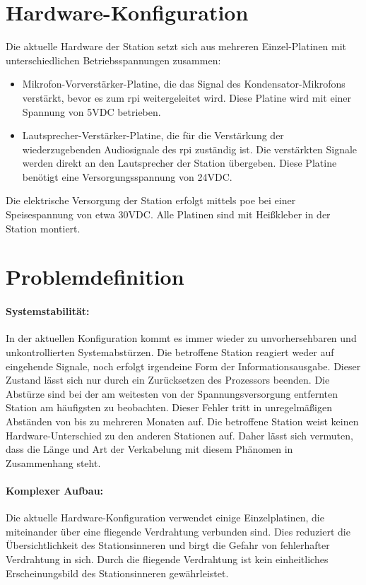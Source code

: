 \section{Hardware-Konfiguration}
Die aktuelle Hardware der Station setzt sich aus mehreren Einzel-Platinen mit unterschiedlichen Betriebsspannungen zusammen:
\begin{itemize}
    \item Mikrofon-Vorverstärker-Platine, die das Signal des Kondensator-Mikrofons verstärkt, bevor es zum \ac{rpi} weitergeleitet wird. Diese Platine wird mit einer Spannung von 5VDC betrieben.
    \item Lautsprecher-Verstärker-Platine, die für die Verstärkung der wiederzugebenden Audiosignale des \ac{rpi} zuständig ist. Die verstärkten Signale werden direkt an den Lautsprecher der Station übergeben. Diese Platine benötigt eine Versorgungsspannung von 24VDC.
\end{itemize}
Die elektrische Versorgung der Station erfolgt mittels \ac{poe} bei einer Speisespannung von etwa 30VDC.
Alle Platinen sind mit Heißkleber in der Station montiert.

\section{Problemdefinition}
\paragraph{Systemstabilität:} %
In der aktuellen Konfiguration kommt es immer wieder zu unvorhersehbaren und unkontrollierten Systemabstürzen.
Die betroffene Station reagiert weder auf eingehende Signale, noch erfolgt irgendeine Form der Informationsausgabe.
Dieser Zustand lässt sich nur durch ein Zurücksetzen des Prozessors beenden.
Die Abstürze sind bei der am weitesten von der Spannungsversorgung entfernten Station am häufigsten zu beobachten.
Dieser Fehler tritt in unregelmäßigen Abständen von bis zu mehreren Monaten auf.
Die betroffene Station weist keinen Hardware-Unterschied zu den anderen Stationen auf.
Daher lässt sich vermuten, dass die Länge und Art der Verkabelung mit diesem Phänomen in Zusammenhang steht.

\paragraph{Komplexer Aufbau:} %
Die aktuelle Hardware-Konfiguration verwendet einige Einzelplatinen, die miteinander über eine fliegende Verdrahtung verbunden sind.
Dies reduziert die Übersichtlichkeit des Stationsinneren und birgt die Gefahr von fehlerhafter Verdrahtung in sich.
Durch die fliegende Verdrahtung ist kein einheitliches Erscheinungsbild des Stationsinneren gewährleistet.

